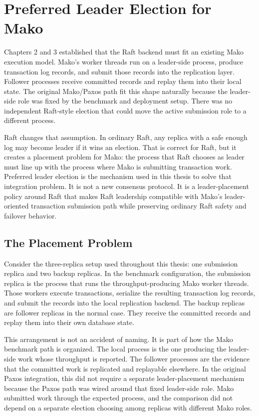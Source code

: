 \chapter{Preferred Leader Election for Mako}

Chapters 2 and 3 established that the Raft backend must fit an existing
Mako execution model. Mako's worker threads run on a leader-side process,
produce transaction log records, and submit those records into the replication
layer. Follower processes receive committed records and replay them into their
local state. The original Mako/Paxos path fit this shape naturally because the
leader-side role was fixed by the benchmark and deployment setup. There was no
independent Raft-style election that could move the active submission role to a
different process.

Raft changes that assumption. In ordinary Raft, any replica with a safe enough
log may become leader if it wins an election. That is correct for Raft, but it
creates a placement problem for Mako: the process that Raft chooses as leader
must line up with the process where Mako is submitting transaction work.
Preferred leader election is the mechanism used in this thesis to solve that
integration problem. It is not a new consensus protocol. It is a leader-placement
policy around Raft that makes Raft leadership compatible with Mako's
leader-oriented transaction submission path while preserving ordinary Raft
safety and failover behavior.

\section{The Placement Problem}

Consider the three-replica setup used throughout this thesis: one submission
replica and two backup replicas. In the benchmark configuration, the submission
replica is the process that runs the throughput-producing Mako worker threads.
Those workers execute transactions, serialize the resulting transaction log
records, and submit the records into the local replication backend. The backup
replicas are follower replicas in the normal case. They receive the committed
records and replay them into their own database state.

This arrangement is not an accident of naming. It is part of how the Mako
benchmark path is organized. The local process is the one producing the
leader-side work whose throughput is reported. The follower processes are the
evidence that the committed work is replicated and replayable elsewhere. In the
original Paxos integration, this did not require a separate leader-placement
mechanism because the Paxos path was wired around that fixed leader-side role.
Mako submitted work through the expected process, and the comparison did not
depend on a separate election choosing among replicas with different Mako roles.


